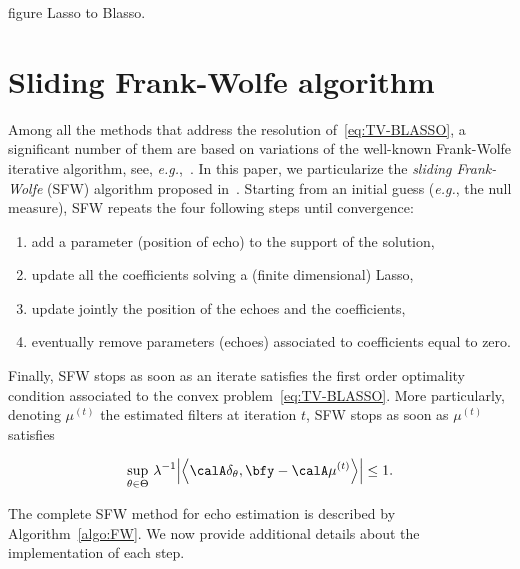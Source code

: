 figure Lasso to Blasso.


\section{Sliding Frank-Wolfe algorithm} \label{sec:suppblaster:SFW}

Among all the methods that address the resolution of~\eqref{eq:TV-BLASSO}, a significant number of them are based on variations of the well-known Frank-Wolfe iterative algorithm, see, \textit{e.g.},~\cite{Bredies2013,Rao2015,denoyelle2019}.
In this paper, we particularize the \emph{sliding Frank-Wolfe} (SFW) algorithm proposed in~\cite{denoyelle2019}.
Starting from an initial guess (\textit{e.g.}, the null measure), SFW repeats the four following steps until convergence:
\begin{enumerate}
	\item add a parameter (position of echo) to the support of the solution,
	\item update all the coefficients solving a (finite dimensional) Lasso,
	\item update jointly the position of the echoes  and the coefficients,
	\item eventually remove parameters (echoes) associated to coefficients equal to zero.
\end{enumerate}
Finally, SFW stops as soon as an iterate satisfies the first order optimality condition associated to the convex problem~\eqref{eq:TV-BLASSO}.
More particularly, denoting $\mu^{(t)}$ the estimated filters at iteration $t$, SFW stops as soon as $\mu^{(t)}$ satisfies~\cite[Proposition 3.6]{Bredies2013}


\begin{equation}
	\label{eq:blasso-dual_certif}
	\sup_{\theta\in\Theta} \,\kinv{\lambda}\kvbar{ \kangle{
		\opObs{}\spike{\theta}, \bfy - \opObs{}\mu^{(t)}
	}}
	\leq 1
	.
\end{equation}


The complete SFW method for echo estimation is described by Algorithm~\ref{algo:FW}.
We now provide additional details about the implementation of each step.


